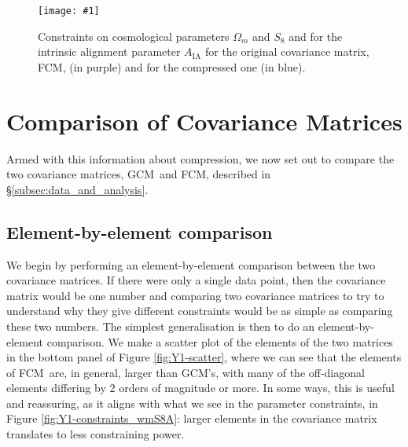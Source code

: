 \documentclass[twocolumn]{\docclass}
\newcommand{\sfig}[2]{
	\texttt{[image: \#1]}
}
\newcommand{\Sfig}[2]{
	\begin{figure}[thbp]
		\sfig{../figures/#1.pdf}{\columnwidth}
		\caption{{\small #2}}
		\label{fig:#1}
	\end{figure}
}
\newcommand{\rf}[1]{Figure \ref{fig:#1}}
\newcommand\full{FCM}
\newcommand\gaussian{GCM}
\begin{document}
	\Sfig{Comp2pt-constraints_wmS8A}{Constraints on cosmological parameters $\Omega_m$ and $S_8$ and for the intrinsic alignment parameter $A_{\mathrm{IA}}$ for the original covariance matrix, \full, (in purple) and for the compressed one (in blue).}
	
	
	\section{Comparison of Covariance Matrices}
	\label{sec:comparison_matrices}
	
	
	Armed with this information about compression, we now set out to compare the two covariance matrices, \gaussian\ and \full, described in \S\ref{subsec:data_and_analysis}. 
	
	\subsection{Element-by-element comparison}
	\label{subsec:compare_one-one}
	
	We begin by performing an element-by-element comparison between the two covariance matrices. If there were only a single data point, then the covariance matrix would be one number and comparing two covariance matrices to try to understand why they give different constraints would be as simple as comparing these two numbers.  The simplest generalisation is then to do an element-by-element comparison. We make a scatter plot of the elements of the two matrices in the bottom panel of \rf{Y1-scatter}, where we can see that the elements of \full\ are, in general, larger than \gaussian's, with many of the off-diagonal elements differing by 2 orders of magnitude or more.
	In some ways, this is useful and reassuring, as it aligns with what we see in the parameter constraints, in \rf{Y1-constraints_wmS8A}: larger elements in the covariance matrix translates to less constraining power. 
	
\end{document}
